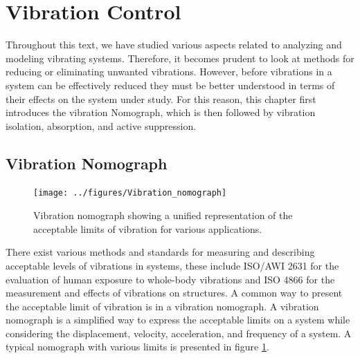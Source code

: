 \documentclass[12pt,letter]{article}
\begin{document}
	
	\setcounter{section}{5}	
	\setcounter{figure}{0}   
	\renewcommand\thefigure{\thesection.\arabic{figure}}
	\setcounter{equation}{0}   
	\renewcommand\theequation{\thesection.\arabic{equation}}

	\section{Vibration Control}

Throughout this text, we have studied various aspects related to analyzing and modeling vibrating systems. Therefore, it becomes prudent to look at methods for reducing or eliminating unwanted vibrations. However, before vibrations in a system can be effectively reduced they must be better understood in terms of their effects on the system under study. For this reason, this chapter first introduces the vibration Nomograph, which is then followed by vibration isolation, absorption, and active suppression.  

\subsection{Vibration Nomograph}

\begin{figure}[tp!]
    \centering
    \texttt{[image: ../figures/Vibration\_nomograph]}
    \caption{Vibration nomograph showing a unified representation of the acceptable limits of vibration for various applications.}
    \label{fig:Vibration_nomograph}
\end{figure}


There exist various methods and standards for measuring and describing acceptable levels of vibrations in systems, these include ISO/AWI 2631 for the evaluation of human exposure to whole-body vibrations and ISO 4866 for the measurement and effects of vibrations on structures. A common way to present the acceptable limit of vibration is in a vibration nomograph.  A vibration nomograph is a simplified way to express the acceptable limits on a system while considering the displacement, velocity, acceleration, and frequency of a system. A typical nomograph with various limits is presented in figure \ref{fig:Vibration_nomograph}. 
\end{document}
